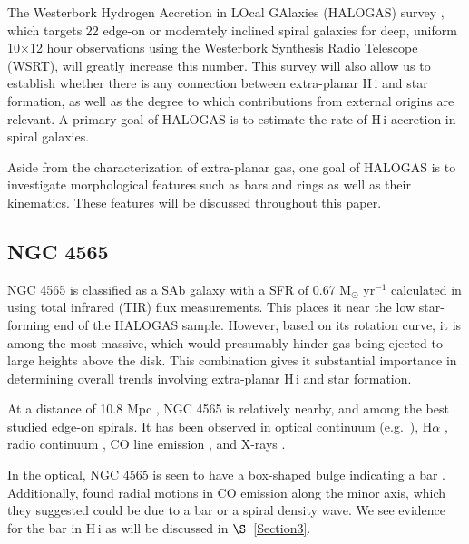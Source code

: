 \documentclass{emulateapj}
\begin{document}
\par
     The Westerbork Hydrogen Accretion in LOcal GAlaxies (HALOGAS) survey \citep{2011A&A...526A.118H},  which targets 22 edge-on or moderately inclined spiral galaxies for deep, uniform 10$\times$12 hour observations using the Westerbork Synthesis Radio Telescope (WSRT), will greatly increase this number. This survey will also allow us to establish whether there is any connection between extra-planar {\sc H\,i} and star formation, as well as the degree to which contributions from external origins are relevant.  A primary goal of HALOGAS is to estimate the rate of {\sc H\,i} accretion in spiral galaxies.


\par
    Aside from the characterization of extra-planar gas, one goal of HALOGAS is to investigate morphological features such as bars and rings as well as their kinematics. These features will be discussed throughout this paper.


\subsection{NGC 4565} \label{Section1.1}
\par
    NGC 4565 is classified as a SAb galaxy \citep{1991trcb.book.....D} with a SFR of 0.67 M$_{\odot}$ yr$^{-1}$ calculated in \citet{2012A&A...544C...1H} using total infrared (TIR) flux measurements.  This places it near the low star-forming end of the HALOGAS sample.  However, based on its rotation curve, it is among the most massive, which would presumably hinder gas being ejected to large heights above the disk.  This combination gives it substantial importance in determining overall trends involving extra-planar {\sc H\,i} and star formation.  

\par
     At a distance of 10.8 Mpc \citep{2011A&A...526A.118H}, NGC 4565 is relatively nearby, and among the best studied edge-on spirals.  It has been observed in optical continuum (e.g.\ \citealt{2010ApJ...715L.176K}), H$\alpha$ \citep{1992ApJ...396...97R}, radio continuum \citep{2008BASIP..25...67K}, CO line emission \citep{1996A&A...310..725N}, and X-rays \citep{1996A&A...305...74V}.

\par
    In the optical, NGC 4565 is seen to have a box-shaped bulge indicating a bar \citep{2010ApJ...715L.176K}.  Additionally, \citet{1996A&A...310..725N} found radial motions in CO emission along the minor axis, which they suggested could be due to a bar or a spiral density wave.  We see evidence for the bar in {\sc H\,i} as will be discussed in $\S$~\ref{Section3}. 
\end{document}
